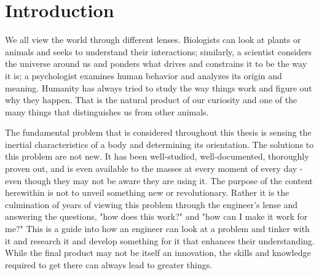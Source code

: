 \chapter{Introduction}\label{chap:intro}
We all view the world through different lenses.
Biologists can look at plants or animals and seeks to understand their interactions;
similarly, a scientist considers the universe around us and ponders what drives and constrains it to be the way it is;
a psychologist examines human behavior and analyzes its origin and meaning.
Humanity has always tried to study the way things work and figure out why they happen.
That is the natural product of our curiosity and one of the many things that distinguishes us from other animals.

The fundamental problem that is considered throughout this thesis is sensing the inertial characteristics of a body and determining its orientation.
The solutions to this problem are not new.
It has been well-studied, well-documented, thoroughly proven out, and is even available to the masses at every moment of every day - even though they may not be aware they are using it.
The purpose of the content herewithin is not to unveil something new or revolutionary.
Rather it is the culmination of years of viewing this problem through the engineer's lense and answering the questions, "how does this work?" and "how can I make it work for me?"
This is a guide into how an engineer can look at a problem and tinker with it and research it and develop something for it that enhances their understanding.
While the final product may not be itself an innovation, the skills and knowledge required to get there can always lead to greater things.